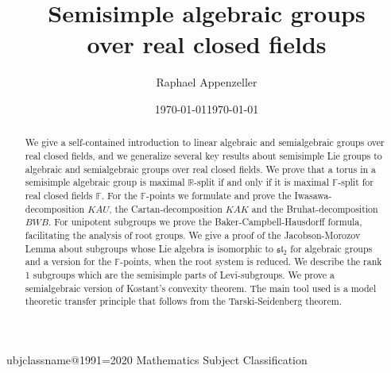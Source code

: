 \documentclass[12pt]{amsart}
\title[Semisimple algebraic groups over real closed fields]{Semisimple algebraic groups \\ over real closed fields}
\author{Raphael Appenzeller}
\date{\today}      %
\newcommand{\F}{\mathbb{F} }
\newcommand{\R}{\mathbb{R} }
\numberwithin{equation}{section}
\theoremstyle{remark} %
\begin{document}
\def\subjclassname{\textup{2020} Mathematics Subject Classification}
\expandafter\let\csname subjclassname@1991\endcsname=\subjclassname
{}
\date{\today}

\begin{abstract}
	We give a self-contained introduction to linear algebraic and semialgebraic groups over real closed fields, and we generalize several key results about semisimple Lie groups to algebraic and semialgebraic groups over real closed fields. We prove that a torus in a semisimple algebraic group is maximal $\R$-split if and only if it is maximal $\F$-split for real closed fields $\F$. For the $\F$-points we formulate and prove the Iwasawa-decomposition $KAU$, the Cartan-decomposition $KAK$ and the Bruhat-decomposition $BWB$. For unipotent subgroups we prove the Baker-Campbell-Hausdorff formula, facilitating the analysis of root groups. We give a proof of the Jacobson-Morozov Lemma about subgroups whose Lie algebra is isomorphic to $\mathfrak{sl}_2$ for algebraic groups and a version for the $\F$-points, when the root system is reduced. We describe the rank 1 subgroups which are the semisimple parts of Levi-subgroups. We prove a semialgebraic version of Kostant's convexity theorem. The main tool used is a model theoretic transfer principle that follows from the Tarski-Seidenberg theorem.
\end{abstract}





\maketitle
\end{document}
